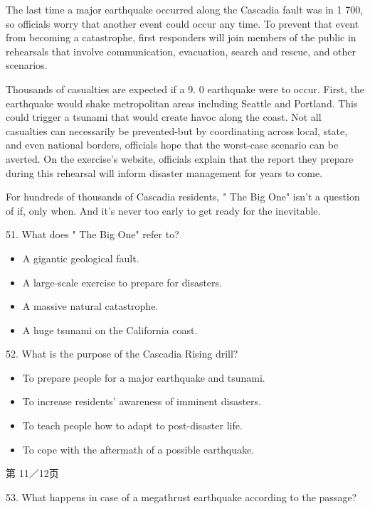 \documentclass[UTF8,11pt]{ctexart}
\begin{document}
The last time a major earthquake occurred along the Cascadia fault was in 1 700, so officials worry that another event could occur any time. To prevent that event from becoming a catastrophe, first responders will join members of the public in rehearsals that involve communication, evacuation, search and rescue, and other scenarios.


Thousands of casualties are expected if a 9. 0 earthquake were to occur. First, the earthquake would shake metropolitan areas including Seattle and Portland. This could trigger a tsunami that would create havoc along the coast. Not all casualties can necessarily be prevented-but by coordinating across local, state, and even national borders, officials hope that the worst-case scenario can be averted. On the exercise's website, officials explain that the report they prepare during this rehearsal will inform disaster management for years to come.


For hundreds of thousands of Cascadia residents, " The Big One" isn't a question of if, only when. And it's never too early to get ready for the inevitable.


51. What does " The Big One" refer to?


\begin{itemize}[leftmargin=2em,itemsep=.2em,topsep=.4em]\item[A.] A gigantic geological fault.
\item[B.] A large-scale exercise to prepare for disasters.
\item[C.] A massive natural catastrophe.
\item[D.] A huge tsunami on the California coast.
\end{itemize}

52. What is the purpose of the Cascadia Rising drill?


\begin{itemize}[leftmargin=2em,itemsep=.2em,topsep=.4em]\item[A.] To prepare people for a major earthquake and tsunami.
\item[B.] To increase residents' awareness of imminent disasters.
\item[C.] To teach people how to adapt to post-disaster life.
\item[D.] To cope with the aftermath of a possible earthquake.
\end{itemize}

第 11／12页


53. What happens in case of a megathrust earthquake according to the passage?
\end{document}
